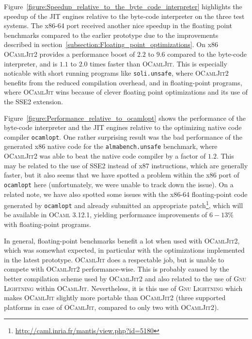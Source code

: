 \documentclass[12pt,a4paper,final]{article}
\begin{document}
Figure~\ref{figure:Speedup_relative_to_the_byte_code_interpreter} highlights the speedup of
the JIT engines relative to the byte-code interpreter on the three test systems. The x86-64
port received another nice speedup in the floating point benchmarks compared to the earlier
prototype due to the improvements described in section~\ref{subsection:Floating_point_optimizations}.
On x86 \textsc{OCamlJit2} provides a performance boost of $2.2$ to $9.6$ compared to the
byte-code interpreter, and is $1.1$ to $2.0$ times faster than \textsc{OCamlJit}. This is
especially noticable with short running programs like \texttt{soli.unsafe}, where \textsc{OCamlJit2}
benefits from the reduced compilation overhead, and in floating-point programs, where \textsc{OCamlJit}
wins because of clever floating point optimizations and its use of the SSE2 extension.

Figure~\ref{figure:Performance_relative_to_ocamlopt} shows the performance of the byte-code
interpreter and the JIT engines relative to the optimizing native code compiler \texttt{ocamlopt}.
One rather surprising result was the bad performance of the generated x86 native code for
the \texttt{almabench.unsafe} benchmark, where \textsc{OCamlJit2} was able to beat the
native code compiler by a factor of $1.2$. This may be related to the use of SSE2 instead of
x87 instructions, which are generally faster, but it also seems that we have spotted a problem
within the x86 port of \texttt{ocamlopt} here (unfortunately, we were unable to track down
the issue). On a related note, we have also spotted some issues with the
x86-64 floating-point code generated by \texttt{ocamlopt} and already submitted an appropriate
patch\footnote{\url{http://caml.inria.fr/mantis/view.php?id=5180}}, which will be available in
\textsc{OCaml} 3.12.1, yielding performance improvements of $6-13\%$ with floating-point programs.

In general, floating-point benchmarks benefit a lot when used with \textsc{OCamlJit2},
which was somewhat expected, in particular with the optimizations implemented in the latest
prototype. \textsc{OCamlJit} does a respectable job, but is unable to compete with
\textsc{OCamlJit2} performance-wise. This is probably caused by the better compilation
scheme used by \textsc{OCamlJit2} and also related to the use of \textsc{Gnu Lightning}
within \textsc{OCamlJit}. Nevertheless, it is this use of \textsc{Gnu Lightning} which
makes \textsc{OCamlJit} slightly more portable than \textsc{OCamlJit2} (three supported
platforms in case of \textsc{OCamlJit}, compared to only two with \textsc{OCamlJit2}).
\end{document}
